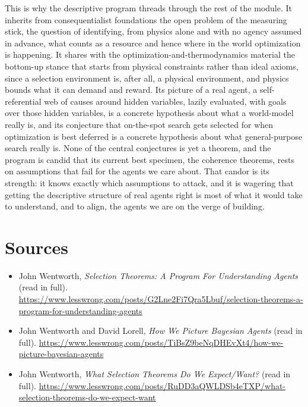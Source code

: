 \documentclass[10pt]{article}
\theoremstyle{definition}
\theoremstyle{remark}
\begin{document}
This is why the descriptive program threads through the rest of the module. It inherits from consequentialist foundations the open problem of the measuring stick, the question of identifying, from physics alone and with no agency assumed in advance, what counts as a resource and hence where in the world optimization is happening. It shares with the optimization-and-thermodynamics material the bottom-up stance that starts from physical constraints rather than ideal axioms, since a selection environment is, after all, a physical environment, and physics bounds what it can demand and reward. Its picture of a real agent, a self-referential web of causes around hidden variables, lazily evaluated, with goals over those hidden variables, is a concrete hypothesis about what a world-model really is, and its conjecture that on-the-spot search gets selected for when optimization is best deferred is a concrete hypothesis about what general-purpose search really is. None of the central conjectures is yet a theorem, and the program is candid that its current best specimen, the coherence theorems, rests on assumptions that fail for the agents we care about. That candor is its strength: it knows exactly which assumptions to attack, and it is wagering that getting the descriptive structure of real agents right is most of what it would take to understand, and to align, the agents we are on the verge of building.

\section*{Sources}

\begin{itemize}[leftmargin=1.5em]
\item John Wentworth, \emph{Selection Theorems: A Program For Understanding Agents} (read in full). \url{https://www.lesswrong.com/posts/G2Lne2Fi7Qra5Lbuf/selection-theorems-a-program-for-understanding-agents}
\item John Wentworth and David Lorell, \emph{How We Picture Bayesian Agents} (read in full). \url{https://www.lesswrong.com/posts/TiBsZ9beNqDHEvXt4/how-we-picture-bayesian-agents}
\item John Wentworth, \emph{What Selection Theorems Do We Expect/Want?} (read in full). \url{https://www.lesswrong.com/posts/RuDD3aQWLDSb4eTXP/what-selection-theorems-do-we-expect-want}
\end{itemize}
\end{document}
